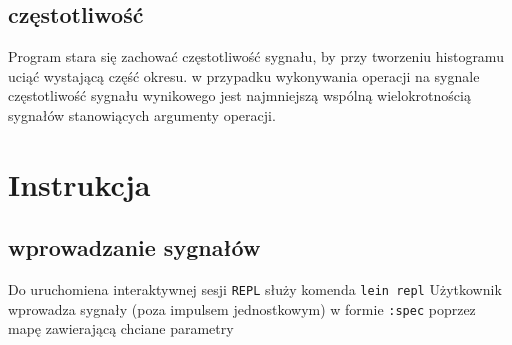 \documentclass[12pt]{article}
\newcommand{\cljt}[1]{\texttt{#1}}
\begin{document}
\subsection{częstotliwość}
Program stara się zachować częstotliwość sygnału, by przy tworzeniu histogramu uciąć wystającą część okresu. w przypadku wykonywania operacji na sygnale częstotliwość sygnału wynikowego jest najmniejszą wspólną wielokrotnością sygnałów stanowiących argumenty operacji.
\section{Instrukcja}
\subsection{wprowadzanie sygnałów}
Do uruchomiena interaktywnej sesji \texttt{REPL} służy komenda \texttt{lein repl}
Użytkownik wprowadza sygnały (poza impulsem jednostkowym) w formie \cljt{:spec} poprzez mapę zawierającą
chciane parametry
\end{document}
